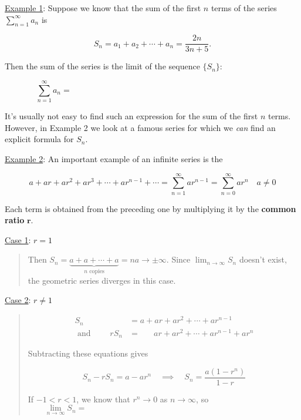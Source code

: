 \documentclass[paper=a4, fontsize=11pt]{scrartcl} %
\numberwithin{equation}{section} %
\numberwithin{figure}{section} %
\numberwithin{table}{section} %
\newcommand{\ds}{\displaystyle}
\begin{document}
  \indent
  
  \underline{Example 1}: Suppose we know that the sum of the first $n$ terms of the series $\ds\sum_{n=1}^\infty a_n$ is
  
  \[S_n = a_1 + a_2 + \cdots + a_n = \ds\frac{2n}{3n+5}.\]
  
  Then the sum of the series is the limit of the sequence $\{S_n\}$:
  
  \[\ds\sum_{n=1}^\infty a_n = \hspace{4in}\]
  \indent
  
  It's usually not easy to find such an expression for the sum of the first $n$ terms. However, in Example 2 we look at a famous series for which we \textit{can} find an explicit formula for $S_n$.\\
  \indent
  
  \underline{Example 2}: An important example of an infinite series is the \underline{\hspace{1.25in}} \underline{\hspace{1in}}
  
  \[a + ar + ar^2 + ar^3 + \cdots + ar^{n-1} + \cdots = \ds\sum_{n=1}^\infty ar^{n-1} = \ds\sum_{n=0}^\infty ar^{n} \quad a\neq 0\]
  
  Each term is obtained from the preceding one by multiplying it by the \textbf{common ratio } $\mathbf{r}$.\\
  \indent
  
  \underline{Case 1}: $r=1$\\
  \begin{quote} 
  \flushleft
  Then $S_n = \underbrace{a + a + \cdots + a}_{\text{$n$ copies}} = na \to \pm \infty$. Since $\ds\lim_{n\to\infty}S_n$ doesn't exist, the geometric series diverges in this case.
  \end{quote}
  
  \newpage
  \underline{Case 2}: $r\neq 1$
  \vspace{-25pt}
  \begin{quote}
  \flushleft
  \begin{align*}
  S_n &= a + ar + ar^2 + \cdots + ar^{n-1}\\
  \text{ and } \quad \quad rS_n &= \hspace{20pt} ar + ar^2 + \cdots + ar^{n-1} + ar^n
  \end{align*}
  
  Subtracting these equations gives
  
  \[S_n - rS_n = a - ar^n \quad \implies \quad S_n = \ds\frac{a(1-r^n)}{1-r}\]
  
  If $-1<r<1$, we know that $r^n\to 0$ as $n\to\infty$, so
  \[\ds\lim_{n\to\infty}S_n = \hspace{4in}\]
  \end{quote}
  \indent
  
\end{document}
